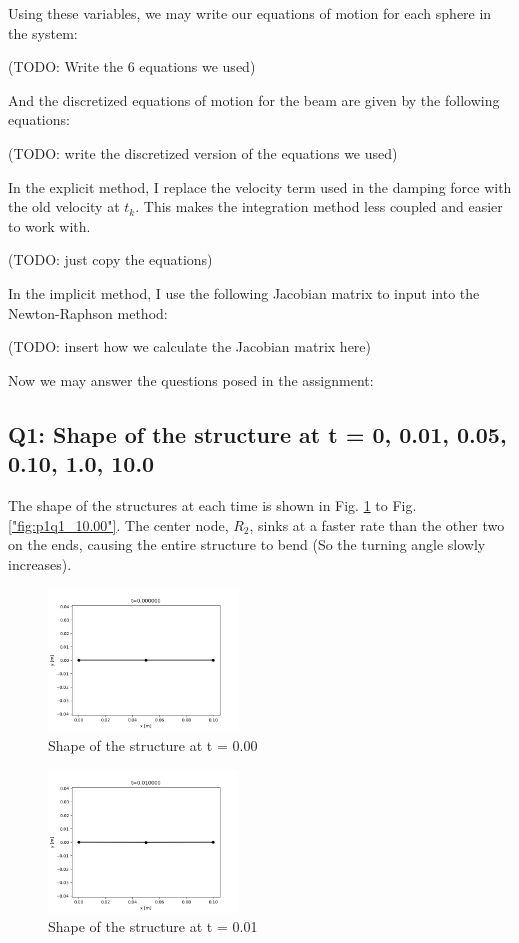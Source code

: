 \documentclass[letterpaper, 10 pt, conference]{ieeeconf}  %
\begin{document}
Using these variables, we may write our equations of motion for each sphere in the system:

(TODO: Write the 6 equations we used)

And the discretized equations of motion for the beam are given by the following equations:

(TODO: write the discretized version of the equations we used)

In the explicit method, I replace the velocity term used in the damping force with the old velocity at $t_k$. This makes the integration method less coupled and easier to work with.

(TODO: just copy the equations)

In the implicit method, I use the following Jacobian matrix to input into the Newton-Raphson method:

(TODO: insert how we calculate the Jacobian matrix here)

Now we may answer the questions posed in the assignment:

\subsection*{Q1: Shape of the structure at t = {0, 0.01, 0.05, 0.10, 1.0, 10.0}}


The shape of the structures at each time is shown in Fig. \ref{"fig:p1q1_0.00"} to Fig. \ref{"fig:p1q1_10.00"}. The center node, $R_2$, sinks at a faster rate than the other two on the ends, causing the entire structure to bend (So the turning angle slowly increases). 

\begin{figure}[!ht]
        \centering
        \includegraphics[width=0.45\textwidth,keepaspectratio]{p1q1_implicit_0.00.png}
        \caption{Shape of the structure at t = 0.00}
        \label{"fig:p1q1_0.00"}
\end{figure}

\begin{figure}[!ht]
        \centering
        \includegraphics[width=0.45\textwidth,keepaspectratio]{p1q1_implicit_0.01.png}
        \caption{Shape of the structure at t = 0.01}
        \label{"fig:p1q1_0.01"}
\end{figure}
\end{document}
